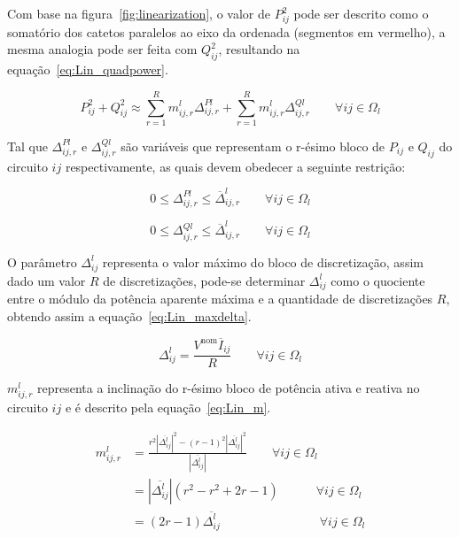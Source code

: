 Com base na figura~\ref{fig:linearization}, o valor de $P_{ij}^{2}$ pode ser descrito como o somatório dos catetos paralelos ao eixo da ordenada (segmentos em vermelho), a mesma analogia pode ser feita com $Q_{ij}^{2}$, resultando na equação~\ref{eq:Lin_quadpower}.

\begin{equation}\label{eq:Lin_quadpower}
    P_{ij}^2 + Q_{ij}^2 \approx \sum_{r = 1}^{R}m_{ij,r}^{l}\Delta_{ij,r}^{Pl} + \sum_{r = 1}^{R}m_{ij,r}^{l}\Delta_{ij,r}^{Ql} \qquad\forall ij\in\Omega_{l} 
\end{equation}

Tal que $\Delta_{ij,r}^{Pl}$ e $\Delta_{ij,r}^{Ql}$ são variáveis que representam o r-ésimo bloco de $P_{ij}$ e $Q_{ij}$ do circuito $ij$ respectivamente, as quais devem obedecer a seguinte restrição:

\begin{equation}\label{eq:Lin_Pdeltalim}
    0 \leq \Delta_{ij,r}^{Pl} \leq \overline{\Delta}_{ij,r}^l \qquad\forall ij\in\Omega_{l} 
\end{equation}

\begin{equation}\label{eq:Lin_Qdeltalim}
    0 \leq \Delta_{ij,r}^{Ql} \leq \overline{\Delta}_{ij,r}^l \qquad\forall ij\in\Omega_{l} 
\end{equation}

O parâmetro $\Delta_{ij}^{l}$ representa o valor máximo do bloco de discretização, assim dado um valor $R$ de discretizações, pode-se determinar $\Delta_{ij}^{l}$ como o quociente entre o módulo da potência aparente máxima e a quantidade de discretizações $R$, obtendo assim a equação~\ref{eq:Lin_maxdelta}.

\begin{equation}\label{eq:Lin_maxdelta}
    \Delta_{ij}^{l} = \frac{V^{\text{nom}}\overline{I}_{ij}}{R} \qquad\forall ij\in\Omega_{l} 
\end{equation}

$m_{ij,r}^{l}$ representa a inclinação do r-ésimo bloco de potência ativa e reativa no circuito $ij$ e é descrito pela equação~\ref{eq:Lin_m}.

\begin{equation}\label{eq:Lin_m}
    \begin{split}
        m_{ij,r}^{l} & = \frac{r^2|\overline{\Delta_{ij}^{l}}|^2 - (r-1)^2|\overline{\Delta_{ij}^{l}}|^2}{|\overline{\Delta_{ij}^{l}}|}\qquad\forall ij\in\Omega_{l}\\
        & = |\overline{\Delta_{ij}^{l}}|(r^2 - r^2 + 2r - 1)\qquad\quad\forall ij\in\Omega_{l}\\
        & = (2r-1)\overline{\Delta_{ij}^{l}}\qquad\qquad\qquad\qquad\forall ij\in\Omega_{l}
    \end{split}
\end{equation}

